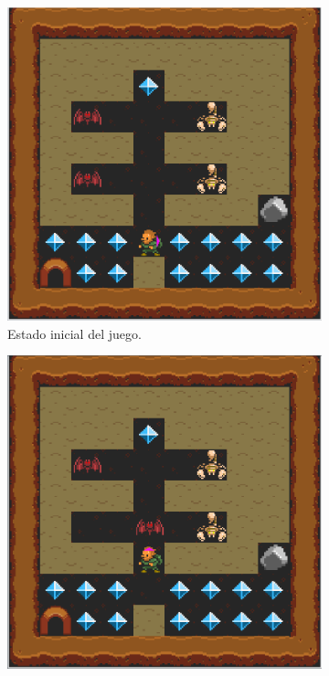 \begin{figure}[H]
    \centering
    \begin{subfigure}{\textwidth}
        \centering
        \includegraphics[scale=0.25]{img/CH08/discrepancy_1.png}
        \caption{Estado inicial del juego.}
        \label{fig:discrepancy_1}
    \end{subfigure}
    \par\bigskip
    \begin{subfigure}{\textwidth}
        \centering
        \includegraphics[scale=0.25]{img/CH08/discrepancy_2.png}

\end{subfigure}
\end{figure}
